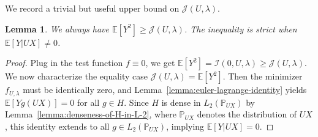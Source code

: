 \documentclass[sn-mathphys-num]{sn-jnl}%
\numberwithin{equation}{section}
\newcommand{\E}{\mathbb{E}}
\renewcommand{\P}{\mathbb{P}}
\newtheorem{lemma}{Lemma}
\theoremstyle{thmstyleone}%
\theoremstyle{thmstyletwo}%
\theoremstyle{thmstylethree}%
\begin{document}
We record a trivial but useful upper bound on $\mathcal{J}(U,\lambda)$.
\vspace{.5em}
\begin{lemma}
\label{lemma:upper-bound-U}
We always have $\E[Y^2] \ge \mathcal{J}(U, \lambda)$. The inequality is strict when $\E[Y|UX] \neq 0$.
\end{lemma}
\begin{proof}
Plug in the test function $f \equiv 0$, we get $\E[Y^2] = \mathcal{I}(0, U, \lambda) \ge \mathcal{J}(U, \lambda)$.
We now characterize the equality case $\mathcal{J}(U,\lambda)=\E[Y^2]$. Then the minimizer $f_{U,\lambda}$  must be identically zero, and Lemma~\ref{lemma:euler-lagrange-identity} yields $\E[Yg(UX)]=0$ for all $g\in H$. Since $H$ is dense in $L_2(\P_{UX})$ by Lemma~\ref{lemma:denseness-of-H-in-L-2}, where $\P_{UX}$ denotes the distribution of $UX$, this identity extends to all $g\in L_2(\P_{UX})$, implying $\E[Y| UX]=0$. %
\end{proof} 
\end{document}
